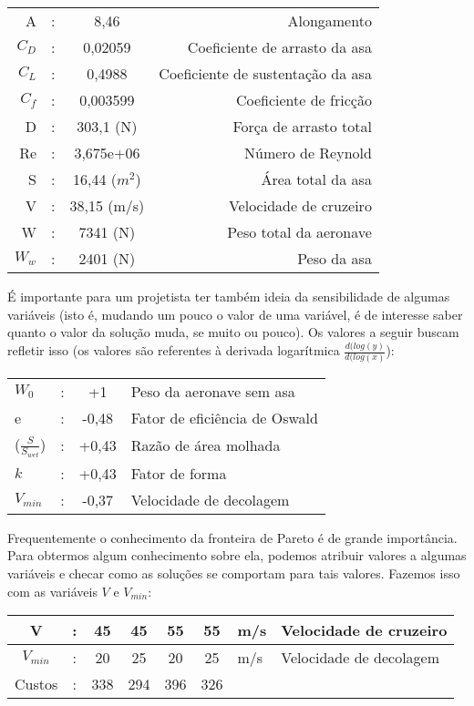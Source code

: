 \documentclass{article}
\begin{document}
\begin{tabular}{|r c c r|}
  \hline
  A & : & 8,46 & Alongamento \\ $C_D$ & : & 0,02059 & Coeficiente de
  arrasto da asa \\ $C_L$ & : & 0,4988 & Coeficiente de sustentação da
  asa \\ $C_f$ & : & 0,003599 & Coeficiente de fricção \\ D & : &
  303,1 (N) & Força de arrasto total \\ Re & : & 3,675e+06 & Número de
  Reynold \\ S & : & 16,44 ($m^2$) & Área total da asa \\ V & : &
  38,15 (m/s) & Velocidade de cruzeiro \\ W & : & 7341 (N) & Peso
                                                             total da aeronave \\ $W_w$ & : & 2401 (N) & Peso da asa \\
  \hline
\end{tabular}

É importante para um projetista ter também ideia da sensibilidade de
algumas variáveis (isto é, mudando um pouco o valor de uma variável, é
de interesse saber quanto o valor da solução muda, se muito ou
pouco). Os valores a seguir buscam refletir isso (os valores são
referentes à derivada logarítmica $\frac{d(log(y)}{d(log(x)}$):

\begin{tabular}{|l c  c  l|}
  \hline
  $W_0$ & : & +1 & Peso da aeronave sem asa \\ e & : & -0,48 & Fator
  de eficiência de Oswald \\ ($\frac{S}{S_{wet}}$) & : & +0,43 & Razão
  de área molhada \\ $k$ & : & +0,43 & Fator de forma \\ $V_{min}$ & : &
                                                                         -0,37 & Velocidade de decolagem \\
  \hline
\end{tabular}


Frequentemente o conhecimento da fronteira de Pareto é de grande
importância. Para obtermos algum conhecimento sobre ela, podemos
atribuir valores a algumas variáveis e checar como as soluções se
comportam para tais valores. Fazemos isso com as variáveis $V$ e
$V_{min}$:

\begin{tabular}{|c c  c  c  c  c  l  l|}
  \hline
  V & : & 45 & 45 & 55 & 55 & m/s & Velocidade de cruzeiro \\ \hline
  $V_{min}$ & : & 20 & 25 & 20 & 25 & m/s & Velocidade de decolagem \\  \hline
  Custos & : & 338 & 294 & 396 & 326 & &\\
  \hline
\end{tabular}
\end{document}
